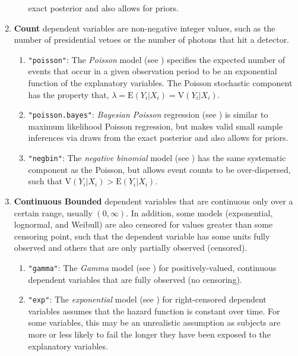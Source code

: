 \begin{enumerate}
\begin{enumerate}
exact posterior and also allows for priors. 
    \end{enumerate}
  \item {\bf Count} dependent variables are non-negative integer
values, such as the number of presidential vetoes or the number of
photons that hit a detector. 
    \begin{enumerate}
    \item {\tt "poisson"}: The {\it Poisson} model (see
      ) specifies the expected number of events that
      occur in a given observation period to be an exponential
      function of the explanatory variables.  The Poisson stochastic
      component has the property that, $\lambda = \textrm{E}(Y_i|X_i)
      = \textrm{V}(Y_i|X_i)$.
    \item {\tt "poisson.bayes"}: {\it Bayesian Poisson} regression (see
) is similar to maximum likelihood Poisson
regression, but makes valid small sample inferences via draws from the
exact posterior and also allows for priors. 
    \item {\tt "negbin"}: The {\it negative binomial} model (see
      ) has the same systematic component as the Poisson,
      but allows event counts to be over-dispersed, such that
      $\textrm{V}(Y_i|X_i) > \textrm{E}(Y_i|X_i)$.
    \end{enumerate}

  \item {\bf Continuous Bounded}\label{duration} dependent variables
that are continuous only over a certain range, usually $(0, \infty)$.
In addition, some models (exponential, lognormal, and
Weibull) are also censored for values greater than some censoring
point, such that the dependent variable has some units fully observed
and others that are only partially observed (censored).  

 \begin{enumerate}

   \item {\tt "gamma"}: The {\it Gamma} model (see ) for
     positively-valued, continuous dependent variables that are fully
observed (no censoring).  

   \item {\tt "exp"}: The {\it exponential} model (see ) for
   right-censored dependent variables assumes that the hazard function
   is constant over time.  For some variables, this may be an unrealistic
   assumption as subjects are more or less likely to fail the longer
   they have been exposed to the explanatory variables.


\end{enumerate}
\end{enumerate}
